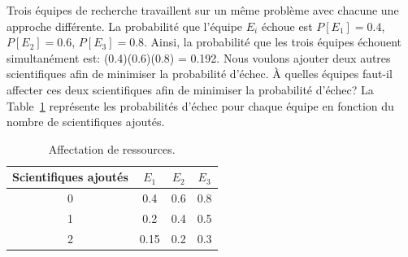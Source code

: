 \begin{example}

Trois équipes de recherche travaillent sur un même problème avec chacune une approche différente.
La probabilité que l'équipe $E_i$ échoue est $P[E_1] = 0.4$, $P[E_2] = 0.6$, $P[E_3] = 0.8$.
Ainsi, la probabilité que les trois équipes échouent simultanément est: (0.4)(0.6)(0.8) = 0.192.
Nous voulons ajouter deux autres scientifiques afin de minimiser la probabilité d'échec.
À quelles équipes faut-il affecter ces deux scientifiques afin de minimiser la probabilité d'échec?
La Table~\ref{tab:ressources} représente les probabilités d'échec pour chaque équipe en fonction du nombre de scientifiques ajoutés.
\begin{table}[htb]
\begin{center}
\begin{tabular}{|c|c|c|c|}
\hline
Scientifiques ajoutés & $E_1$ & $E_2$ & $E_3$ \\
\hline
0 & 0.4 & 0.6 & 0.8 \\
\hline
1 & 0.2 & 0.4 & 0.5 \\
\hline
2 & 0.15 & 0.2 & 0.3 \\
\hline
\end{tabular}
\label{tab:ressources}
\caption{Affectation de ressources.}
\end{center}
\end{table}


\end{example}
